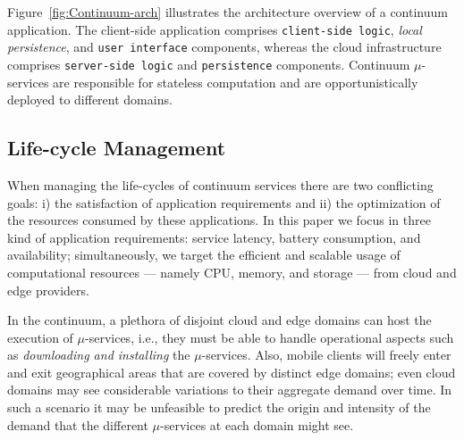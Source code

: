 



Figure~\ref{fig:Continuum-arch} illustrates the architecture overview of a continuum application. The client-side application comprises \texttt{client-side logic}, \textit{local persistence}, and \texttt{user interface} components, whereas the cloud infrastructure comprises \texttt{server-side logic} and \texttt{persistence} components. Continuum $\mu$-services are responsible for stateless computation and are opportunistically deployed to different domains.

\subsection{Life-cycle Management}\label{sec:challenges}


When managing the life-cycles of continuum services there are two conflicting goals: i) the satisfaction of application requirements and ii) the optimization of the resources consumed by these applications. In this paper we focus in three kind of application requirements: service latency, battery consumption, and availability; simultaneously, we target the efficient and scalable usage of computational resources --- namely CPU, memory, and storage --- from cloud and edge providers.

In the continuum, a plethora of disjoint cloud and edge domains can host the execution of $\mu$-services, i.e., they must be able to handle operational aspects such as \textit{downloading and installing} the $\mu$-services. Also, mobile clients will freely enter and exit geographical areas that are covered by distinct edge domains; even cloud domains may see considerable variations to their aggregate demand over time. In such a scenario it may be unfeasible to predict the origin and intensity of the demand that the different $\mu$-services at each domain might see. 

